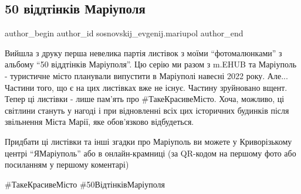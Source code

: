  
 
 
 
 

\subsection{50 віддтінків Маріуполя}
\label{sec:19_02_2023.fb.sosnovskij_evgenij.mariupol.1.50_v_ddt_nk_v_mar_up}

\ifcmt
 author_begin
   author_id sosnovskij_evgenij.mariupol
 author_end
\fi

Вийшла з друку перша невелика партія листівок з моїми \enquote{фотомалюнками} з альбому
\enquote{50 віддтінків Маріуполя}. Цю серію ми разом з m.EHUB та Маріуполь - туристичне
місто планували випустити в Маріуполі навесні 2022 року. Але... Частини того,
що є на цих листівках вже не існує. Частину зруйновано вщент. Тепер ці листівки
- лише пам'ять про \#ТакеКрасивеМісто. Хоча, можливо, ці світлини стануть у
нагоді і при відновленні всіх цих історичних будинків після звільнення Міста
Марії, яке обов'язково відбудеться.

Придбати ці листівки та інші згадки про Маріуполь ви можете у Криворізькому
центрі \enquote{ЯМаріуполь} або в онлайн-крамниці (за QR-кодом на першому фото або
посиланням у першому коментарі)

\#ТакеКрасивеМісто \#50ВідтінківМаріуполя

